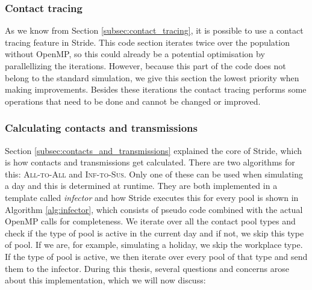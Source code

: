 \subsubsection{Contact tracing}
As we know from Section \ref{subsec:contact_tracing}, it is possible to use a contact tracing feature in Stride. This code section iterates twice over the population without OpenMP, so this could already be a potential optimisation by parallellizing the iterations. However, because this part of the code does not belong to the standard simulation, we give this section the lowest priority when making improvements. Besides these iterations the contact tracing performs some operations that need to be done and cannot be changed or improved.

\subsubsection{Calculating contacts and transmissions}
Section \ref{subsec:contacts_and_transmissions} explained the core of Stride, which is how contacts and transmissions get calculated. There are two algorithms for this: \textsc{All-to-All} and \textsc{Inf-to-Sus}. Only one of these can be used when simulating a day and this is determined at runtime. They are both implemented in a template called \textit{infector} and how Stride executes this for every pool is shown in Algorithm \ref{alg:infector}, which consists of pseudo code combined with the actual OpenMP calls for completeness. We iterate over all the contact pool types and check if the type of pool is active in the current day and if not, we skip this type of pool. If we are, for example, simulating a holiday, we skip the workplace type. If the type of pool is active, we then iterate over every pool of that type and send them to the infector. During this thesis, several questions and concerns arose about this implementation, which we will now discuss:
